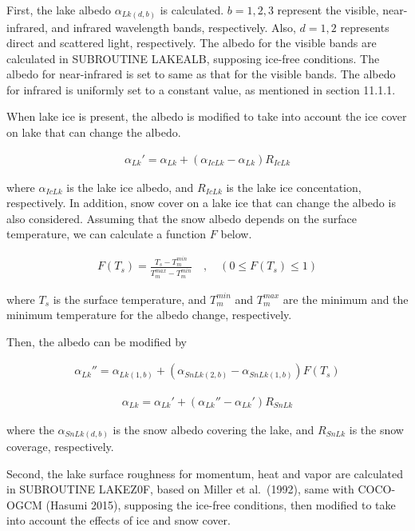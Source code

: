 First, the lake albedo \(\alpha_{Lk(d,b)}\) is calculated. \(b=1,2,3\) represent the visible, near-infrared, and infrared wavelength bands, respectively. Also, \(d=1,2\) represents direct and
scattered light, respectively. The albedo for the visible bands are calculated in SUBROUTINE LAKEALB, supposing ice-free conditions. The albedo for near-infrared is set to same as that for the visible
bands. The albedo for infrared is uniformly set to a constant value, as mentioned in section 11.1.1.

When lake ice is present, the albedo is modified to take into account the ice cover on lake that can change the albedo.

\begin{eqnarray}
    {\alpha_{Lk}'} = \alpha_{Lk} + (\alpha_{IcLk}-\alpha_{Lk}) R_{IcLk}
\end{eqnarray}

where \(\alpha_{IcLk}\) is the lake ice albedo, and \(R_{IcLk}\) is the lake ice concentation, respectively. In addition, snow cover on a lake ice that can change the albedo is also considered.
Assuming that the snow albedo depends on the surface temperature, we can calculate a function \(F\) below.

\begin{eqnarray}
    F(T_s) = \frac{T_s-T_m^{min}}{T_m^{max}-T_m^{min}} \quad,\quad (0 \le F(T_s)\le 1)
\end{eqnarray}

where \(T_s\) is the surface temperature, and \(T_m^{min}\) and \(T_m^{max}\) are the minimum and the minimum temperature for the albedo change, respectively.

Then, the albedo can be modified by

\begin{eqnarray}
    {\alpha_{Lk}''} = \alpha_{Lk(1,b)} + (\alpha_{SnLk(2,b)}-\alpha_{SnLk(1,b)})F(T_s)
\end{eqnarray}

\begin{eqnarray}
    \alpha_{Lk} = {\alpha_{Lk}'} +(\alpha_{Lk}''-\alpha_{Lk}')R_{SnLk}
\end{eqnarray}

where the \(\alpha_{SnLk(d,b)}\) is the snow albedo covering the lake, and \(R_{SnLk}\) is the snow coverage, respectively.

Second, the lake surface roughness for momentum, heat and vapor are calculated in SUBROUTINE LAKEZ0F, based on Miller et al.~(1992), same with COCO-OGCM (Hasumi 2015), supposing the ice-free
conditions, then modified to take into account the effects of ice and snow cover.

